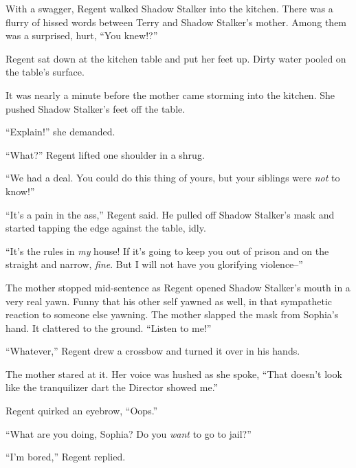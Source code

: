 With a swagger, Regent walked Shadow Stalker into the kitchen.  There was a flurry of hissed words between Terry and Shadow Stalker's mother.  Among them was a surprised, hurt, ``You knew!?''



Regent sat down at the kitchen table and put her feet up.  Dirty water pooled on the table's surface.



It was nearly a minute before the mother came storming into the kitchen.  She pushed Shadow Stalker's feet off the table.



``Explain!'' she demanded.



``What?'' Regent lifted one shoulder in a shrug.



``We had a deal.  You could do this thing of yours, but your siblings were \emph{not} to know!''



``It's a pain in the ass,'' Regent said.  He pulled off Shadow Stalker's mask and started tapping the edge against the table, idly.



``It's the rules in \emph{my} house!  If it's going to keep you out of prison and on the straight and narrow, \emph{fine}.  But I will not have you glorifying violence--''



The mother stopped mid-sentence as Regent opened Shadow Stalker's mouth in a very real yawn.  Funny that his other self yawned as well, in that sympathetic reaction to someone else yawning.  The mother slapped the mask from Sophia's hand.  It clattered to the ground.  ``Listen to me!''



``Whatever,'' Regent drew a crossbow and turned it over in his hands.



The mother stared at it.  Her voice was hushed as she spoke, ``That doesn't look like the tranquilizer dart the Director showed me.''



Regent quirked an eyebrow, ``Oops.''



``What are you doing, Sophia?  Do you \emph{want} to go to jail?''



``I'm bored,'' Regent replied.



